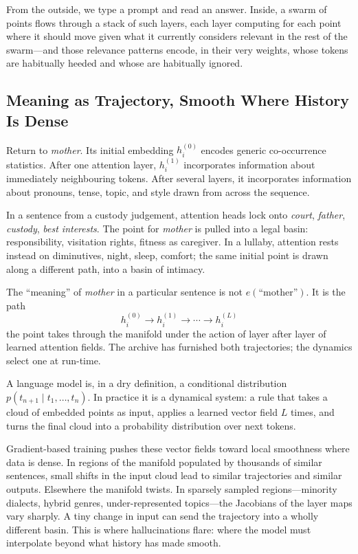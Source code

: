 \documentclass[12pt,a4paper]{article}
\begin{document}
From the outside, we type a prompt and read an answer. Inside, a swarm of points flows through a stack of such layers, each layer computing for each point where it should move given what it currently considers relevant in the rest of the swarm---and those relevance patterns encode, in their very weights, whose tokens are habitually heeded and whose are habitually ignored.

\subsection{Meaning as Trajectory, Smooth Where History Is Dense}

Return to \emph{mother}. Its initial embedding $h^{(0)}_i$ encodes generic co-occurrence statistics. After one attention layer, $h^{(1)}_i$ incorporates information about immediately neighbouring tokens. After several layers, it incorporates information about pronouns, tense, topic, and style drawn from across the sequence.

In a sentence from a custody judgement, attention heads lock onto \emph{court}, \emph{father}, \emph{custody}, \emph{best interests}. The point for \emph{mother} is pulled into a legal basin: responsibility, visitation rights, fitness as caregiver. In a lullaby, attention rests instead on diminutives, night, sleep, comfort; the same initial point is drawn along a different path, into a basin of intimacy.

The ``meaning'' of \emph{mother} in a particular sentence is not $e(\text{``mother''})$. It is the path
\[
h^{(0)}_i \rightarrow h^{(1)}_i \rightarrow \cdots \rightarrow h^{(L)}_i
\]
the point takes through the manifold under the action of layer after layer of learned attention fields. The archive has furnished both trajectories; the dynamics select one at run-time.

A language model is, in a dry definition, a conditional distribution $p(t_{n+1}\mid t_1,\dots,t_n)$. In practice it is a dynamical system: a rule that takes a cloud of embedded points as input, applies a learned vector field $L$ times, and turns the final cloud into a probability distribution over next tokens.

Gradient-based training pushes these vector fields toward local smoothness where data is dense. In regions of the manifold populated by thousands of similar sentences, small shifts in the input cloud lead to similar trajectories and similar outputs. Elsewhere the manifold twists. In sparsely sampled regions---minority dialects, hybrid genres, under-represented topics---the Jacobians of the layer maps vary sharply. A tiny change in input can send the trajectory into a wholly different basin. This is where hallucinations flare: where the model must interpolate beyond what history has made smooth.
\end{document}

